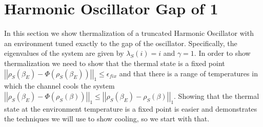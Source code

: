 \documentclass{article}
\newcommand{\norm}[1]{\left| \left| #1 \right| \right|}
\begin{document}
 
    
\section{Harmonic Oscillator Gap of 1}

In this section we show thermalization of a truncated Harmonic Oscillator with an environment tuned exactly to the gap of the oscillator. Specifically, the eigenvalues of the system are given by $\lambda_S(i) = i$ and $\gamma = 1$. In order to show thermalization we need to show that the thermal state is a fixed point $\norm{\rho_S(\beta_E) - \Phi(\rho_S(\beta_E))}_1 \leq \epsilon_{fix}$ and that there is a range of temperatures in which the channel cools the system $\norm{\rho_S(\beta_E) - \Phi(\rho_S(\beta))}_1 \leq \norm{\rho_S(\beta_E) - \rho_S(\beta)}_1$. Showing that the thermal state at the environment temperature is a fixed point is easier and demonstrates the techniques we will use to show cooling, so we start with that.
\end{document}
